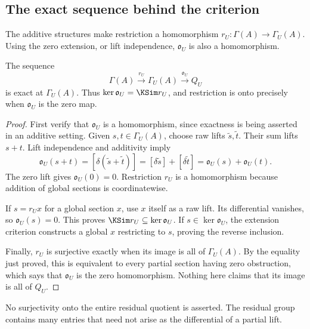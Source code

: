 \subsection{The exact sequence behind the criterion}
The additive structures make restriction a homomorphism
\(r_U:\Gamma(A)\to\Gamma_U(A)\). Using the zero extension, or lift independence, \(\mathfrak o_U\) is also a homomorphism.

\begin{KSproposition}\label{KS:KS12}
The sequence
\[
 \Gamma(A)\xrightarrow{r_U}\Gamma_U(A)
 \xrightarrow{\mathfrak o_U}Q_U
\]
is exact at \(\Gamma_U(A)\). Thus \(\ker\mathfrak o_U=\KSim r_U\), and restriction is onto precisely when \(\mathfrak o_U\) is the zero map.
\end{KSproposition}
\begin{proof}
First verify that $\mathfrak o_U$ is a homomorphism, since exactness is being asserted in an additive setting. Given $s,t\in\Gamma_U(A)$, choose raw lifts $\widetilde s,\widetilde t$. Their sum lifts $s+t$. Lift independence and additivity imply
\[
 \mathfrak o_U(s+t)
 =[\delta(\widetilde s+\widetilde t)]
 =[\delta\widetilde s]+[\delta\widetilde t]
 =\mathfrak o_U(s)+\mathfrak o_U(t).
\]
The zero lift gives $\mathfrak o_U(0)=0$. Restriction $r_U$ is a homomorphism because addition of global sections is coordinatewise.

If $s=r_Ux$ for a global section $x$, use $x$ itself as a raw lift. Its differential vanishes, so $\mathfrak o_U(s)=0$. This proves $\KSim r_U\subseteq\ker\mathfrak o_U$. If $s\in\ker\mathfrak o_U$, the extension criterion constructs a global $x$ restricting to $s$, proving the reverse inclusion.

Finally, $r_U$ is surjective exactly when its image is all of $\Gamma_U(A)$. By the equality just proved, this is equivalent to every partial section having zero obstruction, which says that $\mathfrak o_U$ is the zero homomorphism. Nothing here claims that its image is all of $Q_U$.
\end{proof}
No surjectivity onto the entire residual quotient is asserted. The residual group contains many entries that need not arise as the differential of a partial lift.

